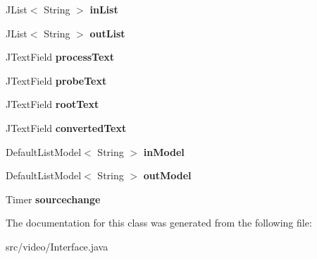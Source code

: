 \begin{DoxyCompactItemize}
\item 
\hypertarget{classvideo_1_1_interface_a013c019a91d836fa7c36118469f2ae4a}{
JList$<$ String $>$ {\bfseries inList}}
\label{classvideo_1_1_interface_a013c019a91d836fa7c36118469f2ae4a}

\item 
\hypertarget{classvideo_1_1_interface_a842bab2003f779cc44d1c41e66d29ef8}{
JList$<$ String $>$ {\bfseries outList}}
\label{classvideo_1_1_interface_a842bab2003f779cc44d1c41e66d29ef8}

\item 
\hypertarget{classvideo_1_1_interface_aaf9ab257953564443c33492397478710}{
JTextField {\bfseries processText}}
\label{classvideo_1_1_interface_aaf9ab257953564443c33492397478710}

\item 
\hypertarget{classvideo_1_1_interface_a9799a9ce7573980a198625991cb2af63}{
JTextField {\bfseries probeText}}
\label{classvideo_1_1_interface_a9799a9ce7573980a198625991cb2af63}

\item 
\hypertarget{classvideo_1_1_interface_a782cb74f7739c471480453e5c9d25f70}{
JTextField {\bfseries rootText}}
\label{classvideo_1_1_interface_a782cb74f7739c471480453e5c9d25f70}

\item 
\hypertarget{classvideo_1_1_interface_a571ca455c3926fa337e0c79e29fb79c1}{
JTextField {\bfseries convertedText}}
\label{classvideo_1_1_interface_a571ca455c3926fa337e0c79e29fb79c1}

\item 
\hypertarget{classvideo_1_1_interface_a191cce4154c72d7c9b3d99b3933144cd}{
DefaultListModel$<$ String $>$ {\bfseries inModel}}
\label{classvideo_1_1_interface_a191cce4154c72d7c9b3d99b3933144cd}

\item 
\hypertarget{classvideo_1_1_interface_a926330858aea4321ae4413ca3b3bb9a2}{
DefaultListModel$<$ String $>$ {\bfseries outModel}}
\label{classvideo_1_1_interface_a926330858aea4321ae4413ca3b3bb9a2}

\item 
\hypertarget{classvideo_1_1_interface_a9ba71d8a5890938345270c4737cad1a5}{
Timer {\bfseries sourcechange}}
\label{classvideo_1_1_interface_a9ba71d8a5890938345270c4737cad1a5}

\end{DoxyCompactItemize}


The documentation for this class was generated from the following file:\begin{DoxyCompactItemize}
\item 
src/video/Interface.java\end{DoxyCompactItemize}
